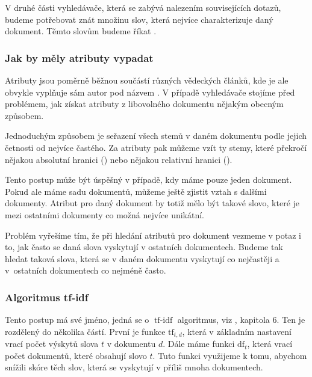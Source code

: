 \documentclass{article}
\DeclareMathOperator{\tfidf}{tf-idf}
\begin{document}
V druhé části vyhledávače, která se zabývá nalezením souvisejících dotazů, budeme potřebovat znát množinu slov, která nejvíce charakterizuje daný dokument. Těmto slovům budeme říkat . 

\subsubsection{Jak by měly atributy vypadat}

Atributy jsou poměrně běžnou součástí různých vědeckých článků, kde je ale obvykle vyplňuje sám autor pod názvem . V případě vyhledávače stojíme před problémem, jak získat atributy z libovolného dokumentu nějakým obecným způsobem. 

Jednoduchým způsobem je seřazení všech stemů v daném dokumentu podle jejich četnosti od nejvíce častého. Za atributy pak můžeme vzít ty stemy, které překročí nějakou absolutní hranici () nebo nějakou relativní hranici (). 

Tento postup může být úspěšný v případě, kdy máme pouze jeden dokument. Pokud ale máme sadu dokumentů, můžeme ještě zjistit vztah s dalšími dokumenty. Atribut pro daný dokument by totiž mělo být takové slovo, které je mezi ostatními dokumenty co možná nejvíce unikátní. 


Problém vyřešíme tím, že při hledání atributů pro dokument vezmeme v potaz i to, jak často se daná slova vyskytují v ostatních dokumentech. Budeme tak hledat taková slova, která se v daném dokumentu vyskytují co nejčastěji a v~ostatních dokumentech co nejméně často. 

\subsubsection{Algoritmus tf-idf}\label{tfidf}
Tento postup má své jméno, jedná se o $\tfidf$ algoritmus, viz \cite{introir}, kapitola 6. Ten je rozdělený do několika částí. První je funkce $\mbox{tf}_{t,d}$, která v základním nastavení vrací počet výskytů slova $t$ v dokumentu $d$. Dále máme funkci $\mbox{df}_t$, která vrací počet dokumentů, které obsahují slovo $t$. Tuto funkci využijeme k tomu, abychom snížili skóre těch slov, která se vyskytují v příliš mnoha dokumentech. 
\end{document}
